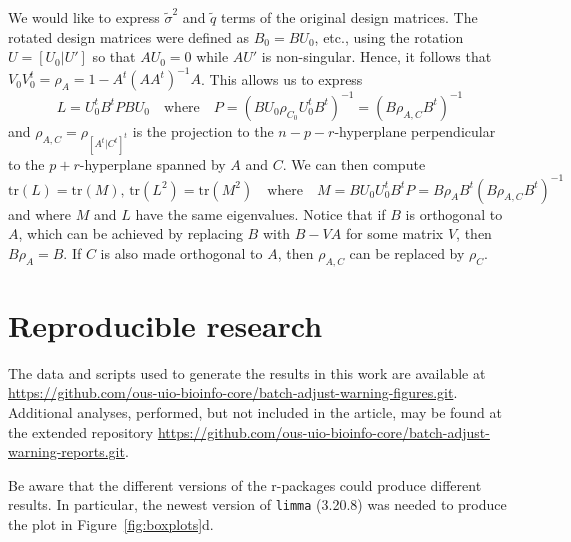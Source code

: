 \documentclass{bio}
\begin{document}
We would like to express $\tilde\sigma^2$ and $\tilde q$ terms of the original design matrices. The rotated design matrices were defined as $B_0=BU_0$, etc., using the rotation $U=[U_0|U']$ so that $AU_0=0$ while $AU'$ is non-singular. Hence, it follows that $V_0V_0^t=\rho_A=1-A^t(AA^t)^{-1}A$. This allows us to express
\begin{equation}
L=U_0^tB^tPBU_0
\quad\text{where}\quad
P=(BU_0\rho_{C_0}U_0^tB^t)^{-1}=(B\rho_{A,C}B^t)^{-1}
\end{equation}
and $\rho_{A,C}=\rho_{[A^t|C^t]^t}$ is the projection to the $n-p-r$-hyperplane perpendicular to the $p+r$-hyperplane spanned by $A$ and $C$. We can then compute
\begin{equation}
\text{tr}(L)=\text{tr}(M),\,
\text{tr}(L^2)=\text{tr}(M^2)
\quad\text{where}\quad
M=BU_0U_0^tB^tP=B\rho_A B^t(B\rho_{A,C}B^t)^{-1}
\end{equation}
and where $M$ and $L$ have the same eigenvalues.
Notice that if $B$ is orthogonal to $A$, which can be achieved by replacing $B$ with $B-VA$ for some matrix $V$, then $B\rho_A=B$. If $C$ is also made orthogonal to $A$, then $\rho_{A,C}$ can be replaced by $\rho_C$.





\section*{Reproducible research}

The data and scripts used to generate the results in this work are available at
\href{https://github.com/ous-uio-bioinfo-core/batch-adjust-warning-figures.git}{https://github.com/ous-uio-bioinfo-core/batch-adjust-warning-figures.git}.
Additional analyses, performed, but not included in the article, may be found at the extended repository 
\href{https://github.com/ous-uio-bioinfo-core/batch-adjust-warning-reports.git}{https://github.com/ous-uio-bioinfo-core/batch-adjust-warning-reports.git}.

Be aware that the different versions of the r-packages could produce different results. In particular, the newest version of \texttt{limma} (3.20.8) was needed to produce the plot in Figure~\ref{fig:boxplots}d.
\end{document}
